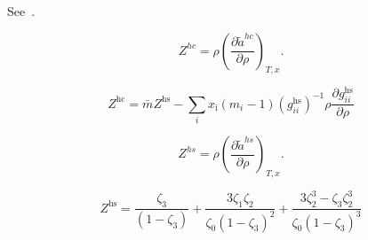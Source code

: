 \documentclass[12pt, letterpaper]{article}
\begin{document}
See~\cite{Gross2001}.

\begin{equation}
    Z^{hc} =\rho\left(\frac{\partial\tilde{a}^{hc}}{\partial\rho}\right)_{T,x}
    .
    \label{eq:z_hc}
\end{equation}


\begin{equation}
    Z^\mathrm{hc}=\bar{m}Z^\mathrm{hs}-\sum_{i}x_{\mathrm{i}}(m_{i}-1)(g_{ii}^\mathrm{hs})^{-1}\rho\frac{\partial g_{ii}^\mathrm{hs}}{\partial\rho}
    \label{eq:z_hc_explicit}
\end{equation}


\begin{equation}
    Z^{hs} =\rho\left(\frac{\partial\tilde{a}^{hs}}{\partial\rho}\right)_{T,x}
    .
    \label{eq:z_hs}
\end{equation}


\begin{equation}
    Z^{\mathrm{hs}}=\frac{\zeta_{3}}{(1-\zeta_{3})}+\frac{3\zeta_{1}\zeta_{2}}{\zeta_{0}(1-\zeta_{3})^{2}}+\frac{3\zeta_{2}^{3}-\zeta_{3}\zeta_{2}^{3}}{\zeta_{0}(1-\zeta_{3})^{3}}
    \label{eq:z_hs_explicit}
\end{equation}

\end{document}
